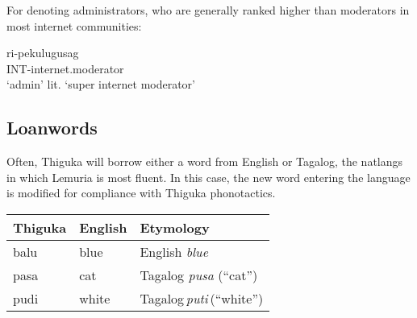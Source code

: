 \documentclass{article}
\begin{document}
\begin{multicols}{2}
For denoting administrators, who are generally ranked higher than moderators in most internet communities:

\begin{exe}
    \ex{} \gll  ri-pekulugusag\\
                INT-internet.moderator\\
    \glt{}      `admin'
    \glt{}      lit. `super internet moderator'
\end{exe}

\subsection{Loanwords}
Often, Thiguka will borrow either a word from English or Tagalog, the natlangs in which Lemuria is most fluent.
In this case, the new word entering the language is modified for compliance with Thiguka phonotactics.

\begin{center}
\begin{tabular}{ m{1cm} m{1cm} | m{4cm} }
    Thiguka & English & Etymology\\
    \hline
    balu & blue  & English \emph{blue}\\
    pasa & cat   & Tagalog \emph{pusa} (``cat'')\\
    pudi & white & Tagalog\,\emph{puti}\,(``white'')\\
\end{tabular}
\end{center}

\end{multicols}
\end{document}
